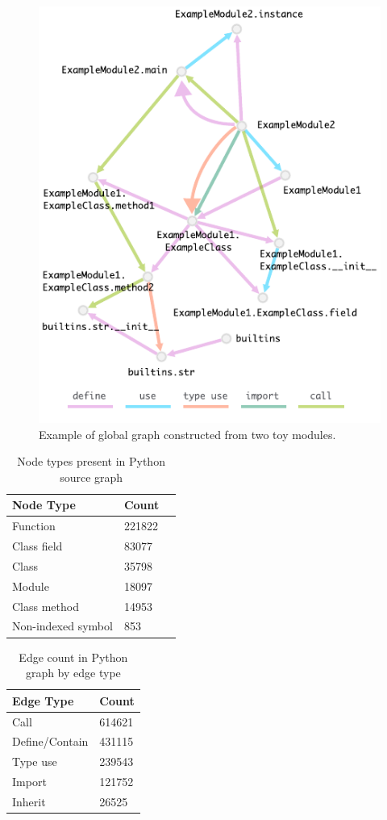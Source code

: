 \documentclass[a4paper,twoside]{article}
\begin{document}
\begin{figure}
    \centering
    \includegraphics{python_graph_example.pdf}
    \caption{Example of global graph constructed from two toy modules.}
    \label{fig:python_graph}
\end{figure}

\begin{table}[]
\centering
\begin{tabular}{|l|l|l|}
 \hline
Node Type        & Count  \\ \hline
Function        & 221822 \\ \hline
Class field     & 83077 \\ \hline
Class           & 35798 \\ \hline
Module          & 18097 \\ \hline
Class method    & 14953 \\ \hline
Non-indexed symbol  & 853  \\ \hline
\end{tabular}
\caption{Node types present in Python source graph \label{tbl:python_node_count}}
\end{table}

\begin{table}[]
\centering
\begin{tabular}{|l|l|}
\hline
Edge Type       & Count \\ \hline
Call            & 614621 \\ \hline
Define/Contain  & 431115 \\ \hline
Type use        & 239543 \\ \hline
Import          & 121752 \\ \hline
Inherit         & 26525 \\ \hline
\end{tabular}
\caption{Edge count in Python graph by edge type \label{tbl:python_edge_count}}
\end{table}
\end{document}
